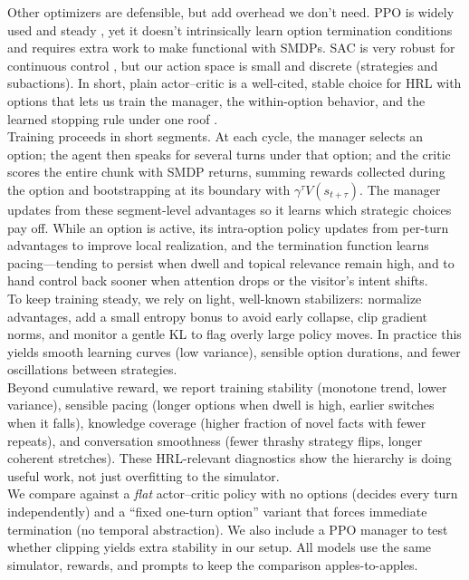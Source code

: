\documentclass[12pt]{article}
\begin{document}
Other optimizers are defensible, but add overhead we don’t need. PPO is widely used and steady \citep{schulman2017ppo-openreview}, yet it doesn't intrinsically learn option termination conditions and requires extra work to make functional with SMDPs. SAC is very robust for continuous control \citep{haarnoja2018sac}, but our action space is small and discrete (strategies and subactions). In short, plain actor–critic is a well-cited, stable choice for HRL with options that lets us train the manager, the within-option behavior, and the learned stopping rule under one roof \citep{sutton1999between,bacon2017option}.\\

Training proceeds in short segments. At each cycle, the manager selects an option; the agent then speaks for several turns under that option; and the critic scores the entire chunk with SMDP returns, summing rewards collected during the option and bootstrapping at its boundary with \(\gamma^{\tau}V(s_{t+\tau})\). The manager updates from these segment-level advantages so it learns which strategic choices pay off. While an option is active, its intra-option policy updates from per-turn advantages to improve local realization, and the termination function learns pacing—tending to persist when dwell and topical relevance remain high, and to hand control back sooner when attention drops or the visitor’s intent shifts.\\

To keep training steady, we rely on light, well-known stabilizers: normalize advantages, add a small entropy bonus to avoid early collapse, clip gradient norms, and monitor a gentle KL to flag overly large policy moves. In practice this yields smooth learning curves (low variance), sensible option durations, and fewer oscillations between strategies.\\

Beyond cumulative reward, we report training stability (monotone trend, lower variance), sensible pacing (longer options when dwell is high, earlier switches when it falls), knowledge coverage (higher fraction of novel facts with fewer repeats), and conversation smoothness (fewer thrashy strategy flips, longer coherent stretches). These HRL-relevant diagnostics show the hierarchy is doing useful work, not just overfitting to the simulator.\\

We compare against a \emph{flat} actor--critic policy with no options (decides every turn independently) and a ``fixed one-turn option'' variant that forces immediate termination (no temporal abstraction). We also include a PPO manager to test whether clipping yields extra stability in our setup. All models use the same simulator, rewards, and prompts to keep the comparison apples-to-apples.\\
\end{document}
